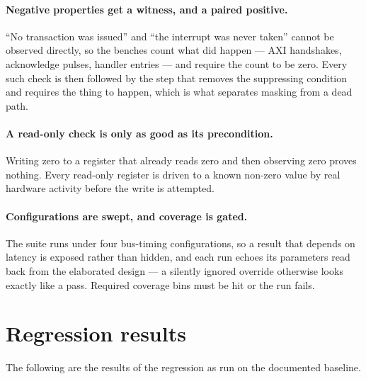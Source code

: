 \paragraph{Negative properties get a witness, and a paired positive.} ``No
transaction was issued'' and ``the interrupt was never taken'' cannot be observed
directly, so the benches count what did happen --- AXI handshakes, acknowledge
pulses, handler entries --- and require the count to be zero. Every such check is
then followed by the step that removes the suppressing condition and requires the
thing to happen, which is what separates masking from a dead path.

\paragraph{A read-only check is only as good as its precondition.} Writing zero
to a register that already reads zero and then observing zero proves nothing.
Every read-only register is driven to a known non-zero value by real hardware
activity before the write is attempted.

\paragraph{Configurations are swept, and coverage is gated.} The suite runs under
four bus-timing configurations, so a result that depends on latency is exposed
rather than hidden, and each run echoes its parameters read back from the
elaborated design --- a silently ignored override otherwise looks exactly like a
pass. Required coverage bins must be hit or the run fails.

\section{Regression results}

The following are the results of the regression as run on the documented
baseline.

